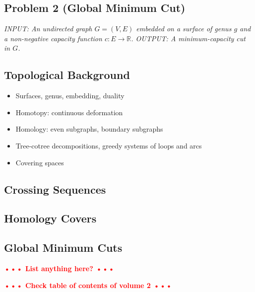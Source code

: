 \documentclass[natbib]{svcyclop}
\def\NOTE#1{\textcolor{Red}{\textbf{\textsf{••• #1 •••}}}}
\begin{document}
\subsection{Problem 2 (Global Minimum Cut)}
{\itshape
\textsc{INPUT}: An undirected graph $G = (V, E)$  embedded on a surface of genus $g$ and a non-negative capacity function $c\colon E \to \mathbb{R}$.
\textsc{OUTPUT}: A minimum-capacity cut in $G$.}




\KeyRes

\subsection{Topological Background}

\begin{itemize}
\item Surfaces, genus, embedding, duality
\item Homotopy: continuous deformation
\item Homology: even subgraphs, boundary subgraphs
\item Tree-cotree decompositions, greedy systems of loops and arcs
\item Covering spaces
\end{itemize}

\subsection{Crossing Sequences}

\subsection{Homology Covers}

\subsection{Global Minimum Cuts}



\OpenProb

\NOTE{List anything here?}


\CrossRef

\NOTE{Check table of contents of volume 2}


\nocite{bk-amfdp-09, hkrs-fspap-97, k-msspp-05, r-mstcp-83, insw-iamcmf-11, multishort, parshort, splitting, gohog, optcycles, e-dgteg-03, c-scgsp-10}



\end{document}

